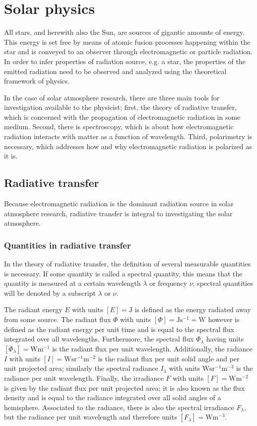 \documentclass[a4paper,11pt]{report}
\def\fc#1{{\color{black}{#1}}} %
\def\lk#1{{\color{black}{#1}}}
\begin{document}
\chapter{Solar physics}
All stars, and herewith also the Sun, are sources of gigantic amounts of energy. This energy is set free by means of atomic fusion processes happening within the star and is conveyed to an observer through electromagnetic or particle radiation. In order to infer properties of \lk{a} radiation source, e.g. a star, the properties of the emitted radiation need to be observed and analyzed using the theoretical framework of physics. 

In the case of solar atmosphere research, there are three main tools for investigation available to the physicist; first, the theory of radiative transfer, which is concerned with the propagation of electromagnetic radiation in some medium. Second, there is spectroscopy, which is about how electromagnetic radiation interacts with matter as a function of wavelength. Third, polarimetry is necessary, which addresses how and why electromagnetic radiation is polarized as it is.

\section{Radiative transfer}
Because electromagnetic radiation is the dominant radiation source in solar atmosphere research, radiative transfer is integral to investigating the solar atmosphere.

\subsection{Quantities in radiative transfer}
In the theory of radiative transfer, the definition of several measurable quantities is necessary. If some quantity is called a spectral quantity, this means that the quantity is measured at a certain wavelength $\lambda$ or frequency $\nu$; spectral quantities will be denoted by a subscript $\lambda$ or $\nu$. 

The radiant energy $E$ with units $[E] = \si{\joule}$ is defined as the energy radiated away from some source. The radiant flux $\Phi$ with units $[\Phi] = \si{\joule\second^{-1}=\watt}$ however is defined as the radiant energy per unit time and is equal to the spectral flux integrated over all wavelengths. Furthermore, the spectral flux $\Phi_\lambda$ having units $[\Phi_\lambda] = \si{\watt\meter^{-1}}$ is the radiant flux per unit wavelength. Additionally, the radiance $I$ with units $[I]=\si{\watt\steradian^{-1}\meter^{-2}}$ is the radiant flux per unit solid angle and per unit projected area; similarly the spectral radiance $I_\lambda$ with units $\si{\watt\steradian^{-1}\meter^{-3}}$ is the radiance per unit wavelength. Finally, the irradiance $F$ with units $[F] = \si{\watt\meter^{-2}}$ is given by the radiant flux per unit projected area; it is also known as the flux density and is equal to the radiance integrated over all solid angles of a hemisphere. Associated to the radiance, there is also the spectral irradiance $F_{\lambda}$, \fc{which is nothing else} but the radiance per unit wavelength and therefore \lk{has} units $[F_{\lambda}]=\si{\watt\meter^{-3}}$.
\end{document}
